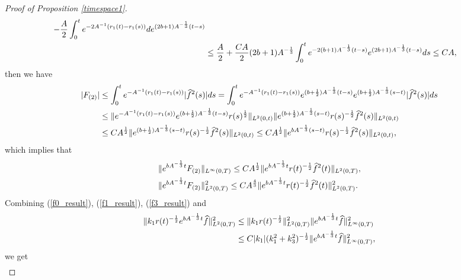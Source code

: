 \documentclass[12pt, reqno]{amsart}
\numberwithin{equation}{section}
\begin{document}
\begin{proof}[Proof of Proposition \ref{timespace1}]
\begin{align*}
			-\frac{A}{2}\int_0^t {\rm e}^{-2A^{-1}\left(r_1(t)-r_1(s)\right)}
			d{\rm e}^{(2b+1)A^{-\frac13 }(t-s)}\\
			&\leq \frac{A}{2}+\frac{CA}{2}(2b+1)A^{-\frac13}\int_{0}^{t}e^{-2(b+1)A^{-\frac13}(t-s)}e^{(2b+1)A^{-\frac13}(t-s)}ds\leq CA,
		\end{align*}
		then we have 
		\begin{align*}
			|F_{(2)}|&\leq 
			\int_0^t {\rm e}^{-A^{-1}\left(r_1(t)-r_1(s)\right)}|\widehat{f}^2(s)|ds
			=\int_0^t {\rm e}^{-A^{-1}\left(r_1(t)-r_1(s)\right)}
			{\rm e}^{(b+\frac12)A^{-\frac13 }(t-s)}
			{\rm e}^{(b+\frac12)A^{-\frac13 }(s-t)}|\widehat{f}^2(s)|ds\\
			&\leq \|{\rm e}^{-A^{-1}\left(r_1(t)-r_1(s)\right)}
			{\rm e}^{(b+\frac12)A^{-\frac13 }(t-s)}r(s)^\frac{1}{2}\|_{L^2(0,t)}
			\|{\rm e}^{(b+\frac12)A^{-\frac13 }(s-t)}
			r(s)^{-\frac{1}{2}}\widehat{f}^2(s)\|_{L^2(0,t)}\\
			&\leq CA^{\frac{1}{2}}	\|{\rm e}^{(b+\frac12)A^{-\frac13 }(s-t)}
			r(s)^{-\frac{1}{2}}\widehat{f}^2(s)\|_{L^2(0,t)}
			\leq CA^{\frac{1}{2}}	\|{\rm e}^{bA^{-\frac13 }(s-t)}
			r(s)^{-\frac{1}{2}}\widehat{f}^2(s)\|_{L^2(0,t)},
		\end{align*}
		which implies that 
		\begin{equation}\label{f3_result}
			\begin{aligned}
				&\|{\rm e}^{bA^{-\frac13 }t}F_{(2)}\|_{L^{\infty}(0,T)}\leq 
				CA^{\frac{1}{2}}
				\|{\rm e}^{bA^{-\frac13 }t}
				r(t)^{-\frac{1}{2}}\widehat{f}^2(t)\|_{L^2(0,T)},\\
				&\|{\rm e}^{bA^{-\frac13 }t}F_{(2)}\|^2_{L^{2}(0,T)}
				\leq CA^{\frac{4}{3}}\|{\rm e}^{bA^{-\frac13 }t}
				r(t)^{-\frac{1}{2}}\widehat{f}^2(t)\|^2_{L^2(0,T)}.
			\end{aligned}	
		\end{equation}
		Combining (\ref{f0_result}), (\ref{f1_result}), (\ref{f3_result}) 
		and 
		\begin{align}\label{eq:k1estimate}
			\|k_1r(t)^{-\frac{1}{2}}{\rm e}^{bA^{-\frac13 }t}\widehat{f}\|_{L^2(0,T)}^2
			&\leq\|k_1r(t)^{-\frac{1}{2}}\|_{L^2(0,T)}^2
			\|{\rm e}^{bA^{-\frac13 }t}\widehat{f}\|_{L^{\infty}(0,T)}^2\nonumber\\
			&\leq C|k_1|(k_1^2+k_3^2)^{-\frac{1}{2}}
			\|{\rm e}^{bA^{-\frac13 }t}\widehat{f}\|_{L^{\infty}(0,T)}^2,
		\end{align}
		we get
		\begin{equation}\label{f_result_1}
			\begin{aligned}

\end{aligned}
\end{equation}
\end{proof}
\end{document}
